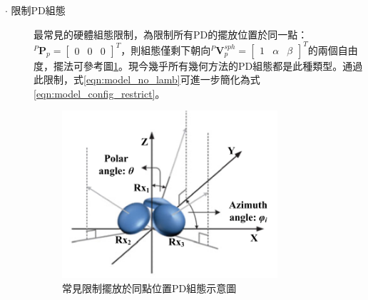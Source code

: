 \begin{description}
            \item[$\cdot$ 限制PD組態]\hfill
            
            \qquad
            最常見的硬體組態限制，為限制所有PD的擺放位置於同一點：$^P\boldsymbol{P}_p=
            \left[\begin{array}{ccc}0&0&0\end{array}\right]^T$，則組態僅剩下朝向$^P\boldsymbol{V}_p^{sph} = \left[\begin{array}{ccc}1&\alpha&\beta\end{array}\right]^T$的兩個自由度，擺法可參考圖\ref{pic:config_orient}。現今幾乎所有幾何方法的PD組態都是此種類型\cite{survey_light2018}。通過此限制，式\ref{eqn:model_no_lamb}可進一步簡化為式\ref{eqn:model_config_restrict}。
            
            \begin{figure}[h]
                \centering
                \includegraphics[width=8cm]{ch2pic/config_orient.png}
                \caption{常見限制擺放於同點位置PD組態示意圖\cite{case:3d_layers}}
                \label{pic:config_orient}
            \end{figure}


\end{description}
